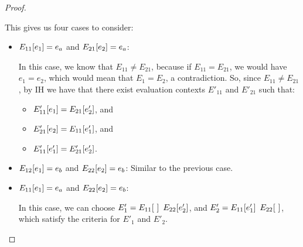 \begin{proof}
\begin{itemize}
      This gives us four cases to consider:

      \begin{itemize}
        \item $E_{11}\hspace{-0.5mm}\left[e_1\right] = e_a$ and
          $E_{21}\hspace{-0.5mm}\left[e_2\right] = e_a$:

          In this case, we know that $E_{11} \neq E_{21}$, because if
          $E_{11} = E_{21}$, we would have $e_1 = e_2$, which would
          mean that $E_1 = E_2$, a contradiction.  So, since $E_{11}
          \neq E_{21}$, by IH we have that there exist evaluation
          contexts $E'_{11}$ and $E'_{21}$ such that:
          \begin{itemize}
          \item $E'_{11}\hspace{-0.5mm}\left[e_1\right] = E_{21}\hspace{-0.5mm}\left[e'_2\right]$, and
          \item $E'_{21}\hspace{-0.5mm}\left[e_2\right] = E_{11}\hspace{-0.5mm}\left[e'_1\right]$, and
          \item $E'_{11}\hspace{-0.5mm}\left[e'_1\right] = E'_{21}\hspace{-0.5mm}\left[e'_2\right]$.
          \end{itemize}


        \item $E_{12}\hspace{-0.5mm}\left[e_1\right] = e_b$ and
          $E_{22}\hspace{-0.5mm}\left[e_2\right] = e_b$: Similar to the previous
          case.
          
        \item $E_{11}\hspace{-0.5mm}\left[e_1\right] = e_a$ and
          $E_{22}\hspace{-0.5mm}\left[e_2\right] = e_b$:

          In this case, we can choose $E'_1 =
          E_{11}\hspace{-0.5mm}\left[~\right]~E_{22}\hspace{-0.5mm}\left[e'_2\right]$, and
          $E'_2 =
          E_{11}\hspace{-0.5mm}\left[e'_1\right]~E_{22}\hspace{-0.5mm}\left[~\right]$, which
          satisfy the criteria for $E'_1$ and $E'_2$.



\end{itemize}
\end{itemize}
\end{proof}
